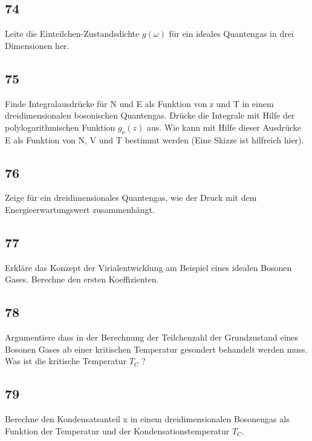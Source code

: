 \documentclass[12pt,a4paper]{report}
\newenvironment{myfrag}{\begin{it}}{\end{it}\vspace{3mm}\par}
\numberwithin{equation}{section}
\begin{document}
\subsection{74}
\begin{myfrag}
Leite die Einteilchen-Zustandsdichte $g(\omega )$ für ein ideales Quantengas in drei
Dimensionen her.
\end{myfrag}
\subsection{75}
\begin{myfrag}
Finde Integralausdrücke für N und E als Funktion von z und T in einem
dreidimensionalen bosonischen Quantengas. Drücke die Integrale mit Hilfe
der polylogarithmischen Funktion $g_\nu (z)$  aus. Wie kann mit Hilfe dieser
Ausdrücke E als Funktion von N, V und T bestimmt werden (Eine Skizze ist
hilfreich hier).
\end{myfrag}
\subsection{76}
\begin{myfrag}
Zeige für ein dreidimensionales Quantengas, wie der Druck mit dem
Energieerwartungswert zusammenhängt.
\end{myfrag}
\subsection{77}
\begin{myfrag}
Erkläre das Konzept der Virialentwicklung am Beispiel eines idealen
Bosonen Gases. Berechne den ersten Koeffizienten.
\end{myfrag}
\subsection{78}
\begin{myfrag}
Argumentiere dass in der Berechnung der Teilchenzahl der Grundzustand
eines Bosonen Gases ab einer kritischen Temperatur gesondert behandelt
werden muss. Was ist die kritische Temperatur  $T_C$ ?
\end{myfrag}
\subsection{79}
\begin{myfrag}
Berechne den Kondensatsanteil x in einem dreidimensionalen Bosonengas als
Funktion der Temperatur und der Kondensationstemperatur $T_C$.
\end{myfrag}
\end{document}
